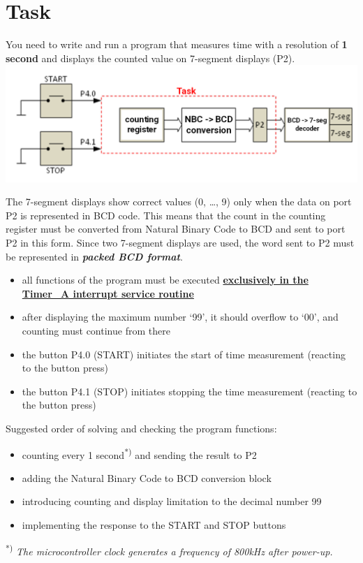 \documentclass{article}
\begin{document}
\section*{Task}
You need to write and run a program that measures time with a resolution of \textbf{1 second} and displays the counted value on 7-segment displays (P2). \\
\includegraphics[width=\textwidth]{"../img/TIMER_A_NBC2BCD_2.png"}

The 7-segment displays show correct values (0, …, 9) only when the data on port P2 is represented in BCD code. This means that the count in the counting register must be converted from Natural Binary Code to BCD and sent to port P2 in this form. Since two 7-segment displays are used, the word sent to P2 must be represented in \textbf{\textit{packed BCD format}}.
\begin{itemize}
    \item all functions of the program must be executed \textbf{\underline{exclusively in the Timer\_A interrupt service routine}}
    \item after displaying the maximum number \textquoteleft99\textquoteright, it should overflow to \textquoteleft00\textquoteright, and counting must continue from there
    \item the button P4.0 (START) initiates the start of time measurement (reacting to the button press)
    \item the button P4.1 (STOP) initiates stopping the time measurement (reacting to the button press)
\end{itemize}
\vspace{5mm}

Suggested order of solving and checking the program functions:
\begin{itemize}
    \item counting every 1 second\textsuperscript{*)} and sending the result to P2
    \item adding the Natural Binary Code to BCD conversion block
    \item introducing counting and display limitation to the decimal number 99
    \item implementing the response to the START and STOP buttons
\end{itemize}
\vspace{5mm}

\textsuperscript{*)} \textit{The microcontroller clock generates a frequency of 800kHz after power-up.}
\end{document}
